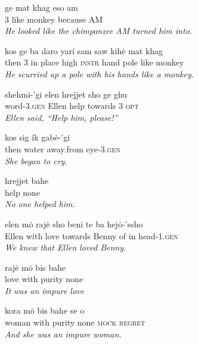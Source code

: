 \documentclass{article}[10pt]
\begin{document}
\begin{exe}
\ex
\gll ge mat khag eso am\\
3 like monkey because AM\\
\trans \emph{He looked like the chimpanzee AM turned him into.}

\ex
\gll kos ge ba daro yar\'{i} sam saw kih\.{e} mat khag\\
then 3 in place high \textsc{instr} hand pole like monkey\\
\trans \emph{He scurried up a pole with his hands like a monkey.}

\ex
\gll shehmi-'gi elen hrejjet sho ge ghu\\
word-3.\textsc{gen} Ellen help towards 3 \textsc{opt}\\
\trans \emph{Ellen said, ``Help him, please!''}

\ex
\gll kos sig \'{i}k gab\.{e}-'gi\\
then water away.from eye-3.\textsc{gen}\\
\trans \emph{She began to cry.}

\ex
\gll hrejjet bahe\\
help none\\
\trans \emph{No one helped him.}

\ex
\gll elen m\.{o} raj\.{e} sho beni te ba hej\.{o}-'ssho\\
Ellen with love towards Benny of in head-1.\textsc{gen}\\
\trans \emph{We knew that Ellen loved Benny.}

\ex
\gll raj\.{e} m\.{o} bis bahe\\
love with purity none\\
\trans \emph{It was an impure love}

\ex
\gll kora m\.{o} bis bahe se o\\
woman with purity none \textsc{mock} \textsc{regret}\\
\trans \emph{And she was an impure woman.}

\end{exe}
\end{document}
